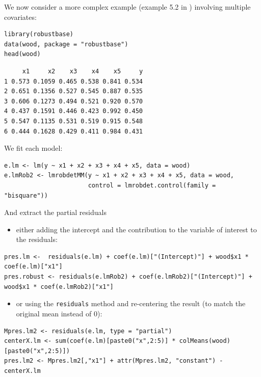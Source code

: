 \documentclass[12pt]{article}
\begin{document}
We now consider a more complex example (example 5.2 in
\cite{maronna2019robust}) involving multiple covariates:
\lstset{language=r,label= ,caption= ,captionpos=b,numbers=none}
\begin{lstlisting}
library(robustbase) 
data(wood, package = "robustbase")
head(wood)
\end{lstlisting}

\begin{verbatim}
     x1     x2    x3    x4    x5     y
1 0.573 0.1059 0.465 0.538 0.841 0.534
2 0.651 0.1356 0.527 0.545 0.887 0.535
3 0.606 0.1273 0.494 0.521 0.920 0.570
4 0.437 0.1591 0.446 0.423 0.992 0.450
5 0.547 0.1135 0.531 0.519 0.915 0.548
6 0.444 0.1628 0.429 0.411 0.984 0.431
\end{verbatim}


\noindent We fit each model:
\lstset{language=r,label= ,caption= ,captionpos=b,numbers=none}
\begin{lstlisting}
e.lm <- lm(y ~ x1 + x2 + x3 + x4 + x5, data = wood)
e.lmRob2 <- lmrobdetMM(y ~ x1 + x2 + x3 + x4 + x5, data = wood,
                       control = lmrobdet.control(family = "bisquare"))
\end{lstlisting}

\noindent  And extract the partial residuals
\begin{itemize}
\item either adding the intercept and the contribution to the variable of
interest to the residuals:
\end{itemize}
\lstset{language=r,label= ,caption= ,captionpos=b,numbers=none}
\begin{lstlisting}
pres.lm <-  residuals(e.lm) + coef(e.lm)["(Intercept)"] + wood$x1 * coef(e.lm)["x1"]
pres.robust <- residuals(e.lmRob2) + coef(e.lmRob2)["(Intercept)"] + wood$x1 * coef(e.lmRob2)["x1"]
\end{lstlisting}

\begin{itemize}
\item or using the \texttt{residuals} method  and re-centering the result (to
match the original mean instead of 0):
\end{itemize}
\lstset{language=r,label= ,caption= ,captionpos=b,numbers=none}
\begin{lstlisting}
Mpres.lm2 <- residuals(e.lm, type = "partial")
centerX.lm <- sum(coef(e.lm)[paste0("x",2:5)] * colMeans(wood)[paste0("x",2:5)])
pres.lm2 <- Mpres.lm2[,"x1"] + attr(Mpres.lm2, "constant") - centerX.lm
\end{lstlisting}
\end{document}
